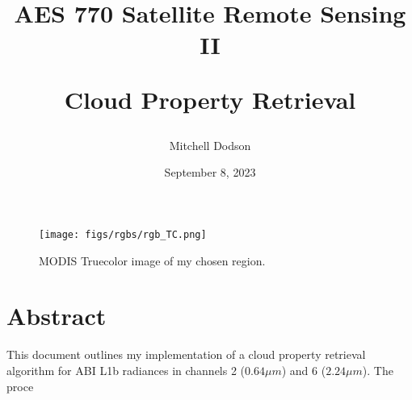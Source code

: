 \documentclass[12pt]{article}
\title{AES 770 Satellite Remote Sensing II

Cloud Property Retrieval}
\author{Mitchell Dodson}
\date{September 8, 2023}
\begin{document}
\maketitle

\begin{figure}[h!]
    \centering
    \texttt{[image: figs/rgbs/rgb\_TC.png]}
    \caption{MODIS Truecolor image of my chosen region.}
    \label{title_image}
\end{figure}

\section{Abstract}

This document outlines my implementation of a cloud property retrieval algorithm for ABI L1b radiances in channels 2 ($0.64\mu m$) and 6 ($2.24\mu m$). The proce


\clearpage
\end{document}
